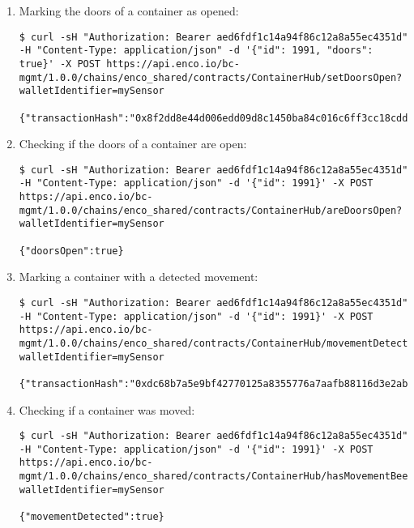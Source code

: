 \documentclass[12pt]{article}
\begin{document}
\begin{enumerate}
\begin{lstlisting}[frame=single,basicstyle=\tiny]
{"myIds":[1991,5684,2563],"myAddresses":["0x1984564c678a5ec0ee0c70b4d04a906dc9bf46e3","0x311b0ca1c53d19406527a3190ef59f4fbdd8c8e8","0x4672d379e72158887f7592a072b1d6eb8f23ccc7"]}
		\end{lstlisting}
	\item Marking the doors of a container as opened:
		\begin{lstlisting}[frame=single,basicstyle=\tiny]
$ curl -sH "Authorization: Bearer aed6fdf1c14a94f86c12a8a55ec4351d" -H "Content-Type: application/json" -d '{"id": 1991, "doors": true}' -X POST https://api.enco.io/bc-mgmt/1.0.0/chains/enco_shared/contracts/ContainerHub/setDoorsOpen?walletIdentifier=mySensor

{"transactionHash":"0x8f2dd8e44d006edd09d8c1450ba84c016c6ff3cc18cdd74aa07e27c8cf21703c"}
		\end{lstlisting}
	\item Checking if the doors of a container are open:
		\begin{lstlisting}[frame=single,basicstyle=\tiny]
$ curl -sH "Authorization: Bearer aed6fdf1c14a94f86c12a8a55ec4351d" -H "Content-Type: application/json" -d '{"id": 1991}' -X POST https://api.enco.io/bc-mgmt/1.0.0/chains/enco_shared/contracts/ContainerHub/areDoorsOpen?walletIdentifier=mySensor

{"doorsOpen":true}
		\end{lstlisting}
	\item Marking a container with a detected movement:
		\begin{lstlisting}[frame=single,basicstyle=\tiny]
$ curl -sH "Authorization: Bearer aed6fdf1c14a94f86c12a8a55ec4351d" -H "Content-Type: application/json" -d '{"id": 1991}' -X POST https://api.enco.io/bc-mgmt/1.0.0/chains/enco_shared/contracts/ContainerHub/movementDetected?walletIdentifier=mySensor

{"transactionHash":"0xdc68b7a5e9bf42770125a8355776a7aafb88116d3e2ab6c7413b0635b6ea565c"}
		\end{lstlisting}
	\item Checking if a container was moved:
		\begin{lstlisting}[frame=single,basicstyle=\tiny]
$ curl -sH "Authorization: Bearer aed6fdf1c14a94f86c12a8a55ec4351d" -H "Content-Type: application/json" -d '{"id": 1991}' -X POST https://api.enco.io/bc-mgmt/1.0.0/chains/enco_shared/contracts/ContainerHub/hasMovementBeenDetected?walletIdentifier=mySensor

{"movementDetected":true}
		\end{lstlisting}\thispagestyle{empty}
\end{enumerate}
\end{document}
